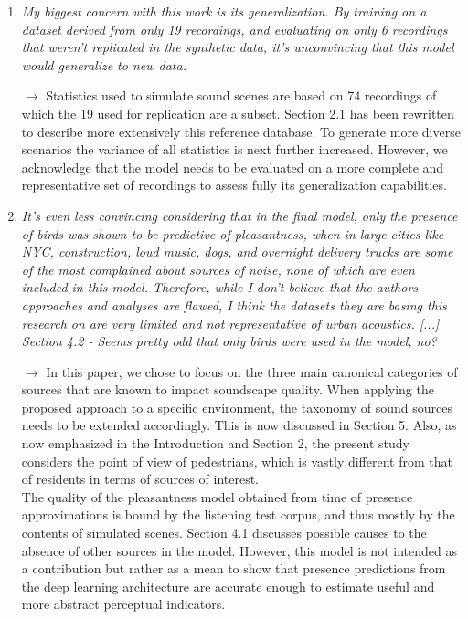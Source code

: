\documentclass[10pt]{article}
\begin{document}
\begin{enumerate}

\item \emph{My biggest concern with this work is its generalization. By training on a dataset derived from only 19 recordings, and evaluating on only 6 recordings that weren't replicated in the synthetic data, it's unconvincing that this model would generalize to new data.}

$\rightarrow$ Statistics used to simulate sound scenes are based on 74 recordings of which the 19 used for replication are a subset. Section 2.1 has been rewritten to describe more extensively this reference database. To generate more diverse scenarios the variance of all statistics is next further increased. However, we acknowledge that the model needs to be evaluated on a more complete and representative set of recordings to assess fully its generalization capabilities.

\item \emph{It's even less convincing considering that in the final model, only the presence of birds was shown to be predictive of pleasantness, when in large cities like NYC, construction, loud music, dogs, and overnight delivery trucks are some of the most complained about sources of noise, none of which are even included in this model. Therefore, while I don't believe that the authors approaches and analyses are flawed, I think the datasets they are basing this research on are very limited and not representative of urban acoustics. [...]\\
Section 4.2 - Seems pretty odd that only birds were used in the model, no?}

$\rightarrow$ In this paper, we chose to focus on the three main canonical categories of sources that are known to impact soundscape quality. When applying the proposed approach to a specific environment, the taxonomy of sound sources needs to be extended accordingly. This is now discussed in Section 5. Also, as now emphasized in the Introduction and Section 2, the present study considers the point of view of pedestrians, which is vastly different from that of residents in terms of sources of interest.\\
The quality of the pleasantness model obtained from time of presence approximations is bound by the listening test corpus, and thus mostly by the contents of simulated scenes. Section 4.1 discusses possible causes to the absence of other sources in the model. However, this model is not intended as a contribution but rather as a mean to show that presence predictions from the deep learning architecture are accurate enough to estimate useful and more abstract perceptual indicators.


\end{enumerate}
\end{document}
